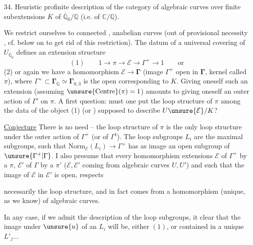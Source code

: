 34. Heuristic profinite description of the category
of algebraic curves  over  finite
subextensions $K$ of $\overline{\mathbb Q}_0/\mathbb Q$ (i.e. of $\mathbb C/\mathbb Q$).

We restrict ourselves to  connected , anabelian curves
(out of provisional necessity \unsure{!}, cf. below on  to
get rid of this restriction). The datum of
a universal covering of  $U_{\overline{\mathbb Q}_0}$ defines an
extension structure
\[
(1)\qquad 1\longrightarrow\pi\longrightarrow\mathcal E\longrightarrow\Gamma^{+}\longrightarrow1\qquad\text{or}
\]
(2) or again we have a homomorphism $\mathcal E\longrightarrow\boldsymbol{\Gamma}$
(image $\Gamma^{+}$ open in $\boldsymbol{\Gamma}$,
kernel called $\pi$),
where $\Gamma^{+}\subset\boldsymbol{\Gamma}_{\mathbb Q}\simeq\boldsymbol{\Gamma}_{0,3}$ is the open 
corresponding to $K$. Giving oneself such an
extension (assuming $\unsure{\mathrm{Centre}}(\pi)=1$) amounts to
giving oneself an outer action of $\Gamma'$ on $\pi$.
A first question: must one put the
loop structure of $\pi$ among the  data  of
the object (1) (or ) supposed to describe $U\unsure{\mathcal E}/K$?

\uline{Conjecture} There is no need -- the loop structure
of $\pi$ is the only loop structure 
under the outer action of $\Gamma^{+}$ (or of $\Gamma^{\natural}$). The
loop subgroups $L_i$ are the maximal
subgroups, such that $\mathrm{Norm}_{\mathcal E}(L_i)\longrightarrow\Gamma^{+}$ has
as image an open subgroup of $\unsure{\Gamma^{+}|\Gamma}$.
I
also presume that every homomorphism  extensions
$\mathcal E$ of $\Gamma^{+}$ by a $\pi$, $\mathcal E'$ of $\Gamma$ by a $\pi'$
($\mathcal E,\mathcal E'$ coming from algebraic curves $U,U'$) and such
that the image of $\mathcal E$ in $\mathcal E'$ is open, respects

necessarily the loop structure, and in fact
comes from a homomorphism (unique, as we know) of algebraic
curves.

In any case, if we admit the description of the
loop subgroups, it  clear that the image under
$\unsure{u}$ of an $L_i$ will be, either $(1)$, or contained
in a unique $L'_j\ldots$


